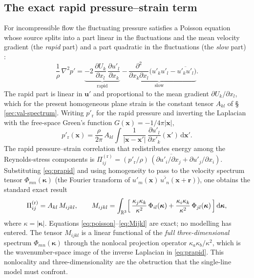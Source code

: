 \documentclass[lineno]{JFM-FLM_Au}
\begin{document}
\subsection{The exact rapid pressure--strain term}\label{sec:exact-pi}

For incompressible flow the fluctuating pressure satisfies a Poisson equation
whose source splits into a part linear in the fluctuations and the mean
velocity gradient (the \emph{rapid} part) and a part quadratic in the
fluctuations (the \emph{slow} part) \citep{Pope2000}:
\begin{equation}
  \frac{1}{\rho}\,\nabla^2 p'
  = \underbrace{-2\,\frac{\partial U_k}{\partial x_l}\,
      \frac{\partial u'_l}{\partial x_k}}_{\text{rapid}}
    \;\underbrace{-\,\frac{\partial^2}{\partial x_k\partial x_l}
      \bigl(u'_k u'_l - \overline{u'_k u'_l}\bigr)}_{\text{slow}} .
  \label{eq:poisson-rapid}
\end{equation}
The rapid part is linear in $\boldsymbol{u}'$ and proportional to the mean
gradient $\partial U_k/\partial x_l$, which for the present homogeneous plane
strain is the constant tensor $A_{kl}$ of \S\,\ref{sec:val-spectrum}. Writing
$p'_{\mathrm r}$ for the rapid pressure and inverting the Laplacian with the
free-space Green's function $G(\boldsymbol{x})=-1/4\pi|\boldsymbol{x}|$,
\begin{equation}
  p'_{\mathrm r}(\boldsymbol{x})
  = \frac{\rho}{2\pi}\,A_{kl}\!\int
    \frac{1}{|\boldsymbol{x}-\boldsymbol{x}'|}\,
    \frac{\partial u'_l}{\partial x'_k}(\boldsymbol{x}')\,
    \mathrm{d}\boldsymbol{x}' .
  \label{eq:prapid}
\end{equation}
The rapid pressure--strain correlation that redistributes energy among the
Reynolds-stress components is
$\Pi^{(\mathrm r)}_{ij}
   = \overline{(p'_{\mathrm r}/\rho)\,(\partial u'_i/\partial x_j
     + \partial u'_j/\partial x_i)}$.
Substituting \eqref{eq:prapid} and using homogeneity to pass to the
velocity spectrum tensor
$\Phi_{mn}(\boldsymbol{\kappa})$
(the Fourier transform of $\overline{u'_m(\boldsymbol{x})\,
u'_n(\boldsymbol{x}+\boldsymbol{r})}$),
one obtains the standard exact result
\citep{BatchelorProudman1954,Crow1968,HuntCarruthers1990}
\begin{equation}
  \Pi^{(\mathrm r)}_{ij}
  = A_{kl}\,M_{ijkl},
  \qquad
  M_{ijkl}
  = \int_{\mathbb{R}^3}
    \Bigl[\,
      \frac{\kappa_j\kappa_k}{\kappa^2}\,\Phi_{il}(\boldsymbol{\kappa})
      + \frac{\kappa_i\kappa_k}{\kappa^2}\,\Phi_{jl}(\boldsymbol{\kappa})
    \,\Bigr]\,\mathrm{d}\boldsymbol{\kappa},
  \label{eq:Mijkl}
\end{equation}
where $\kappa=|\boldsymbol{\kappa}|$. Equations
\eqref{eq:poisson}--\eqref{eq:Mijkl} are exact; no modelling has entered. The
tensor $M_{ijkl}$ is a linear functional of the \emph{full three-dimensional}
spectrum $\Phi_{mn}(\boldsymbol{\kappa})$ through the nonlocal projection
operator $\kappa_a\kappa_b/\kappa^2$, which is the wavenumber-space image of
the inverse Laplacian in \eqref{eq:prapid}. This nonlocality and
three-dimensionality are the obstruction that the single-line model must
confront.
\end{document}
